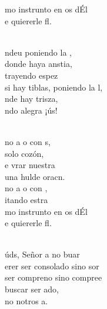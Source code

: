\documentclass[12pt]{article}
\begin{document}
\begin{multicols*}{2}
\begin{cancion}
\begin{chorus}
	mo instrunto en os dÉl\\
	e quiererle fl.\\
	\end{chorus}%
	\jump\\
	ndeu poniendo la ,\\
	donde haya anstia,\\
	trayendo espez\\
	si hay tiblas, poniendo la l,\\
	nde hay trisza, \\
	ndo alegra ¡ús!\\\jump\\
	\begin{chorus}%
	no a o con s,\\
	 solo cozón,\\
	e vrar nuestra   \\
	 una hulde oracn.\\
	no a o con , \\
	itando estra \\
	mo instrunto en os dÉl\\
	e quiererle fl.\\
	\end{chorus}%
	\jump\\
	úds, Señor a no buar\\
	erer ser consolado sino sor\\
	ser compreno sino compree\\
	 buscar ser ado,\\
	no notros a.\\\jump\\

\end{cancion}
\end{multicols*}
\end{document}
